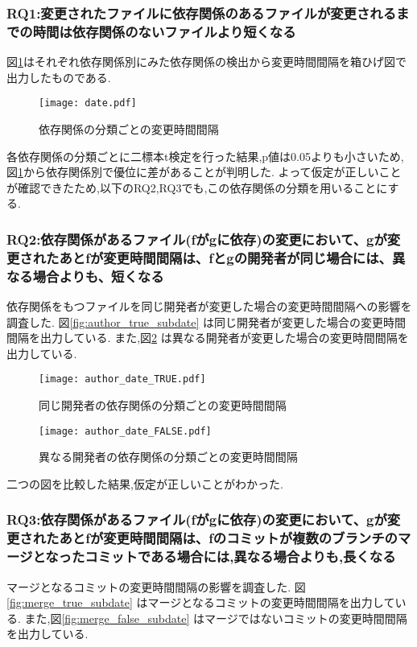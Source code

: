 \documentclass{fose2016}           %
\begin{document}
\subsubsection{RQ1:変更されたファイルに依存関係のあるファイルが変更されるまでの時間は依存関係のないファイルより短くなる}
図\ref{fig:subdate}はそれぞれ依存関係別にみた依存関係の検出から変更時間間隔を箱ひげ図で出力したものである.　　

\begin{figure}
\centering
\texttt{[image: date.pdf]}
\caption{依存関係の分類ごとの変更時間間隔}
\label{fig:subdate} 
\end{figure}



各依存関係の分類ごとに二標本t検定を行った結果,p値は0.05よりも小さいため,図\ref{fig:subdate}から依存関係別で優位に差があることが判明した.
よって仮定が正しいことが確認できたため,以下のRQ2,RQ3でも,この依存関係の分類を用いることにする.


\subsubsection{RQ2:依存関係があるファイル(fがgに依存)の変更において、gが変更されたあとfが変更時間間隔は、fとgの開発者が同じ場合には、異なる場合よりも、短くなる}
依存関係をもつファイルを同じ開発者が変更した場合の変更時間間隔への影響を調査した.
図\ref{fig:author_true_subdate} は同じ開発者が変更した場合の変更時間間隔を出力している.
また,図\ref{fig:author_false_subdate} は異なる開発者が変更した場合の変更時間間隔を出力している.

\begin{figure}
\centering
\begin{minipage}{0.49\columnwidth}
\centering
\texttt{[image: author\_date\_TRUE.pdf]}
\caption{同じ開発者の依存関係の分類ごとの変更時間間隔}
\label{fig:author_true_subdate} 
\end{minipage}
\begin{minipage}{0.49\columnwidth}
\centering
\texttt{[image: author\_date\_FALSE.pdf]}
\caption{異なる開発者の依存関係の分類ごとの変更時間間隔}
\label{fig:author_false_subdate} 
\end{minipage}
\end{figure}
二つの図を比較した結果,仮定が正しいことがわかった.

\subsubsection{RQ3:依存関係があるファイル(fがgに依存)の変更において、gが変更されたあとfが変更時間間隔は、fのコミットが複数のブランチのマージとなったコミットである場合には,異なる場合よりも,長くなる}
マージとなるコミットの変更時間間隔の影響を調査した.
図\ref{fig:merge_true_subdate} はマージとなるコミットの変更時間間隔を出力している.
また,図\ref{fig:merge_false_subdate} はマージではないコミットの変更時間間隔を出力している.
\end{document}
